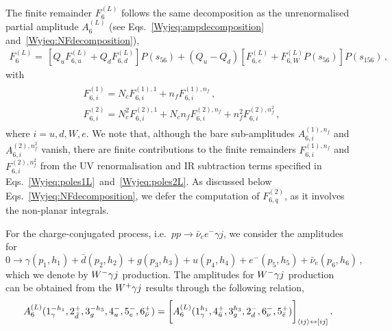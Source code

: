 \documentclass[main.tex]{subfiles}
\begin{document}
The finite remainder $F_6^{(L)}$ follows the same decomposition as the unrenormalised partial amplitude $A_6^{(L)}$ (see Eqs.~\eqref{Wyjeq:ampdecomposition} and~\eqref{Wyjeq:NFdecomposition}),
\begin{equation}
\begin{aligned}
F_{6}^{(L)} = \,  \left[ Q_u F^{(L)}_{6,u} + Q_d F^{(L)}_{6,d}  \right] P(s_{56})  + (Q_u - Q_d) \left[ F^{(L)}_{6,e} + F^{(L)}_{6,W} P(s_{56}) \right] P(s_{156}) \,,
\end{aligned}
\label{Wyjeq:finremdecomposition}
\end{equation}
with
\begin{align} \label{Wyjeq:NfDecompositionF} 
\begin{aligned}
& F^{(1)}_{6,i} = N_c F^{(1),1}_{6,i} + n_f F^{(1),n_f}_{6,i} \,, \\
& F^{(2)}_{6,i} = N_c^2 F^{(2),1}_{6,i} + N_c n_f F^{(2),n_f}_{6,i} + n_f^2 F^{(2),n_f^2}_{6,i} \,,
\end{aligned}
\end{align}
where  $i=u,d,W,e$. We note that, although the bare sub-amplitudes $A^{(1),n_f}_{6,i}$ and $A^{(2),n_f^2}_{6,i}$ vanish, there are finite contributions to the finite remainders $F^{(1),n_f}_{6,i}$
and $F^{(2),n_f^2}_{6,i}$ from the UV renormalisation and IR subtraction terms specified in Eqs.~\eqref{Wyjeq:poles1L}~and~\eqref{Wyjeq:poles2L}. 
As discussed below Eqs.~\eqref{Wyjeq:NFdecomposition}, we defer the computation of $F^{(2)}_{6,q}$, as it involves the non-planar integrals.

For the charge-conjugated process, i.e.\ $pp \to \bar\nu_e e^- \gamma j$, we consider the amplitudes for
\begin{equation}
0 \rightarrow \gamma(p_1,h_1)+\bar{d}(p_2,h_2)+g(p_3,h_3)+u(p_4,h_4)+e^-(p_5,h_5)+\bar\nu_e(p_6,h_6) \,, \nonumber
\end{equation}
which we denote by $W^-\gamma j$ production. The amplitudes for $W^-\gamma j$ production can be obtained from the $W^+\gamma j$ results through the following relation,
\begin{equation}  \label{Wyjeq:wmajamps}
A_{6}^{(L)}(1^{-h_1}_\gamma,2^{+}_{\bar{d}},3^{-h_3}_g,4^{-}_u,5^{-}_{e},6^{+}_{\bar\nu}) =  
\bigg[ A_{6}^{(L)}(1^{h_1}_\gamma,4^{+}_{\bar{u}},3^{h_3}_g,2^{-}_d,6^{-}_{\nu},5^{+}_{\bar{e}})\bigg]_{\langle ij\rangle \leftrightarrow [ij]} \,.
\end{equation} 
\end{document}
